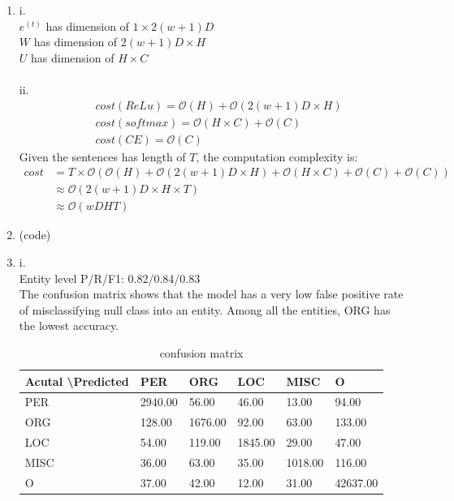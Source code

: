 \documentclass[10pt]{article}
\begin{document}
\begin{enumerate}[label=(\alph*)]
\item
i.\\
$e^{(t)}$ has dimension of $1 \times 2(w+1)D$\\
$W$ has dimension of $2(w+1)D \times H$\\
$U$ has dimension of $H \times C$\\
\\
ii.\\
$$
\begin{aligned}
& cost(ReLu) = \mathcal{O}(H) + \mathcal{O}(2(w+1)D \times H)\\
& cost(softmax) = \mathcal{O}(H \times C) + \mathcal{O}(C)\\
& cost(CE) = \mathcal{O}(C)
\end{aligned}
$$
Given the sentences has length of $T$, the computation complexity is:
$$
\begin{aligned}
cost
& = T \times \mathcal{O}(\mathcal{O}(H) + \mathcal{O}(2(w+1)D \times H) + \mathcal{O}(H \times C) + \mathcal{O}(C) + \mathcal{O}(C))\\
& \approx \mathcal{O}(2(w+1)D \times H \times T)\\
& \approx \mathcal{O}(wDHT)
\end{aligned}
$$

\item
(code)

\item
i.\\
Entity level P/R/F1: 0.82/0.84/0.83\\
The confusion matrix shows that the model has a very low false positive rate of misclassifying null class into an entity. Among all the entities,  ORG has the lowest accuracy.
\begin{table}[h]
	\centering
	\caption{confusion matrix}
	\begin{tabular}{|l|l|l|l|l|l|}
	\hline
	Acutal \textbackslash Predicted & PER     & ORG     & LOC     & MISC    & O        \\ \hline
	PER   & 2940.00 & 56.00   & 46.00   & 13.00   & 94.00    \\ \hline
	ORG   & 128.00  & 1676.00 & 92.00   & 63.00   & 133.00   \\ \hline
	LOC   & 54.00   & 119.00  & 1845.00 & 29.00   & 47.00    \\ \hline
	MISC  & 36.00   & 63.00   & 35.00   & 1018.00 & 116.00   \\ \hline
	O     & 37.00   & 42.00   & 12.00   & 31.00   & 42637.00 \\ \hline
	\end{tabular}
\end{table}


\end{enumerate}
\end{document}
